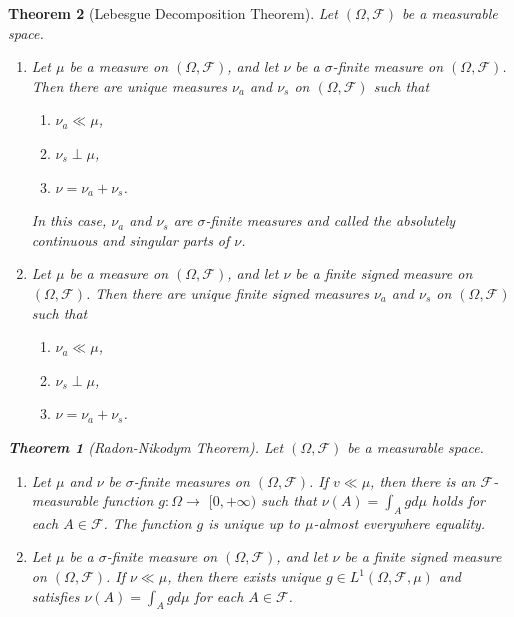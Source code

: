 \documentclass{report}
\newtheorem{theorem}{Theorem}[section]
\theoremstyle{nonumberplain}
\begin{document}
\begin{theorem}[Lebesgue Decomposition Theorem]
	Let $(\Omega, \mathcal{F})$ be a measurable space.
\begin{enumerate}
	\item Let $\mu$ be a measure on $(\Omega, \mathcal{F})$, and let $\nu$ be a $\sigma$-finite measure on $(\Omega, \mathcal{F})$. Then there are unique measures $\nu_{a}$ and $\nu_{s}$ on $(\Omega, \mathcal{F})$ such that
	\begin{enumerate}[label=(\alph*)]
		\item $\nu_{a}\ll\mu$,
		\item $\nu_{s}\perp\mu$,
		\item $\nu=\nu_{a}+\nu_{s}$.
	\end{enumerate}
	In this case, $\nu_a$ and $\nu_s$ are $\sigma$-finite measures and called the absolutely continuous and singular parts of $\nu$.
	\item Let $\mu$ be a measure on $(\Omega, \mathcal{F})$, and let $\nu$ be a finite signed measure on $(\Omega, \mathcal{F})$. Then there are unique finite signed measures $\nu_{a}$ and $\nu_{s}$ on $(\Omega, \mathcal{F})$ such that
	\begin{enumerate}[label=(\alph*)]
		\item $\nu_{a}\ll\mu$,
		\item $\nu_{s}\perp\mu$,
		\item $\nu=\nu_{a}+\nu_{s}$.
	\end{enumerate}
\end{enumerate}
\begin{theorem}[Radon-Nikodym Theorem]
	Let $(\Omega, \mathcal{F})$ be a measurable space.
	\begin{enumerate}
		\item Let $\mu$ and $\nu$ be $\sigma$-finite measures on $(\Omega, \mathcal{F})$. If $v\ll\mu$, then there is an $\mathcal{F}$-measurable function $g:\Omega\rightarrow$ $[0,+\infty)$ such that $\nu(A)=\int_{A} g d \mu$ holds for each $A\in\mathcal{F}$. The function $g$ is unique up to $\mu$-almost everywhere equality.
		\item Let $\mu$ be a $\sigma$-finite measure on $(\Omega, \mathcal{F})$, and let $\nu$ be a finite signed measure on $(\Omega, \mathcal{F})$. If $\nu\ll\mu$, then there exists unique $g\in L^{1}(\Omega, \mathcal{F}, \mu)$ and satisfies $\nu(A)=\int_{A} g d \mu$ for each $A\in\mathcal{F}$.
	\end{enumerate}
\end{theorem}

\end{theorem}
\end{document}
